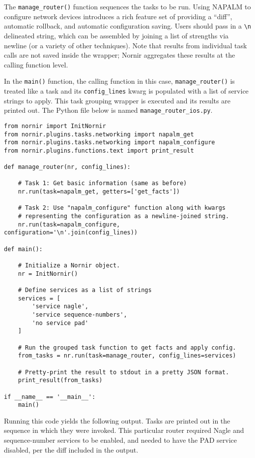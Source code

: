 The \verb|manage_router()| function sequences the tasks to be run. Using
NAPALM to configure network devices introduces a rich feature set of providing
a ``diff'', automatic rollback, and automatic configuration saving. Users
should pass in a \verb|\n| delineated string, which can be assembled by joining a
list of strengths via newline (or a variety of other techniques). Note that
results from individual task calls are not saved inside the wrapper; Nornir
aggregates these results at the calling function level.

In the \verb|main()| function, the calling function in this case,
\verb|manage_router()| is treated like a task and its \verb|config_lines|
kwarg is populated with a list of service strings to apply. This task grouping
wrapper is executed and its results are printed out. The Python file below
is named \verb|manage_router_ios.py|.

\begin{verbatim}
from nornir import InitNornir
from nornir.plugins.tasks.networking import napalm_get
from nornir.plugins.tasks.networking import napalm_configure
from nornir.plugins.functions.text import print_result

def manage_router(nr, config_lines):

    # Task 1: Get basic information (same as before)
    nr.run(task=napalm_get, getters=['get_facts'])

    # Task 2: Use "napalm_configure" function along with kwargs
    # representing the configuration as a newline-joined string.
    nr.run(task=napalm_configure, configuration='\n'.join(config_lines))

def main():

    # Initialize a Nornir object.
    nr = InitNornir()

    # Define services as a list of strings
    services = [
        'service nagle',
        'service sequence-numbers',
        'no service pad'
    ]

    # Run the grouped task function to get facts and apply config.
    from_tasks = nr.run(task=manage_router, config_lines=services)

    # Pretty-print the result to stdout in a pretty JSON format.
    print_result(from_tasks)

if __name__ == '__main__':
    main()
\end{verbatim}

Running this code yields the following output. Tasks are printed out in the
sequence in which they were invoked. This particular router required Nagle and
sequence-number services to be enabled, and needed to have the PAD service
disabled, per the diff included in the output.

